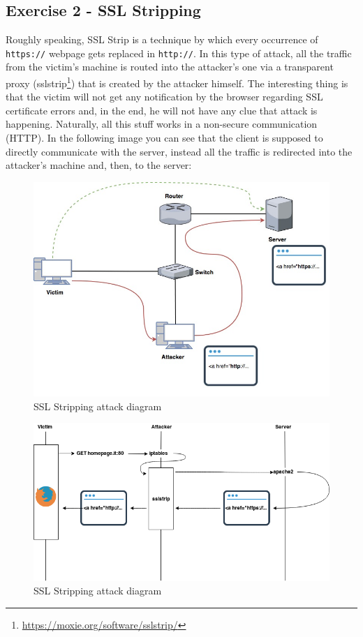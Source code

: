 \documentclass[draft]{article}
\begin{document}
\subsection{Exercise 2 - SSL Stripping}
Roughly speaking, SSL Strip is a technique by which every occurrence of \texttt{https://} webpage gets replaced in \texttt{http://}.
In this type of attack, all the traffic from the victim’s machine is routed into the attacker's one via a transparent proxy
(sslstrip\footnote{\url{https://moxie.org/software/sslstrip/}}) that is created by the attacker himself.
The interesting thing is that the victim will not get any notification by the browser regarding SSL certificate errors
and, in the end, he will not have any clue that attack is happening.
Naturally, all this stuff works in a non-secure communication (HTTP).
In the following image you can see that the client is supposed to directly communicate with the server,
instead all the traffic is redirected into the attacker's machine and, then, to the server:
\begin{figure}[h]
  \center
  \includegraphics[width=.8\textwidth]{../figures/sslstrip}
  \caption{SSL Stripping attack diagram}
  \label{sslstrip}
\end{figure}
\begin{figure}[h]
  \center
  \includegraphics[width=.8\textwidth]{../figures/sslstrip_time}
  \caption{SSL Stripping attack diagram}
\end{figure}
\end{document}

